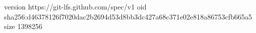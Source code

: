 version https://git-lfs.github.com/spec/v1
oid sha256:d46378126f7020dac2b2694d53d8bb3dc427a68c371e02e818a86753cfb665a5
size 1398256
